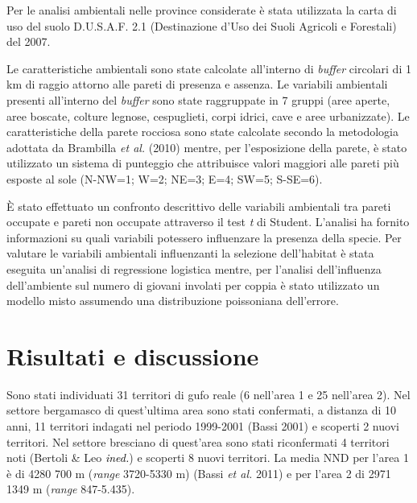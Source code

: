 Per le analisi ambientali nelle province considerate \`e stata
utilizzata la carta di uso del suolo D.U.S.A.F. 2.1 (Destinazione
d{\textquoteright}Uso dei Suoli Agricoli e Forestali) del 2007.

Le caratteristiche ambientali sono state calcolate
all{\textquoteright}interno di \textit{buffer }circolari di 1 km di
raggio attorno alle pareti di presenza e assenza. Le variabili
ambientali presenti all{\textquoteright}interno del \textit{buffer
}sono state raggruppate in 7 gruppi (aree aperte, aree boscate, colture
legnose, cespuglieti, corpi idrici, cave e aree urbanizzate). Le
caratteristiche della parete rocciosa sono state calcolate secondo la
metodologia adottata da Brambilla \textit{et al. }(2010) mentre, per
l{\textquoteright}esposizione della parete, \`e stato utilizzato un
sistema di punteggio che attribuisce valori maggiori alle pareti pi\`u
esposte al sole (N-NW=1; W=2; NE=3; E=4; SW=5; S-SE=6).

\`E stato effettuato un confronto descrittivo delle variabili ambientali
tra pareti occupate e pareti non occupate attraverso il test \textit{t
}di Student. L{\textquoteright}analisi ha fornito informazioni su quali
variabili potessero influenzare la presenza della specie. Per valutare
le variabili ambientali influenzanti la selezione
dell{\textquoteright}habitat \`e stata eseguita
un{\textquoteright}analisi di regressione logistica mentre, per
l{\textquoteright}analisi dell{\textquoteright}influenza
dell{\textquoteright}ambiente sul numero di giovani involati per coppia
\`e stato utilizzato un modello misto assumendo una distribuzione
poissoniana dell{\textquoteright}errore. 

\section*{Risultati e discussione}

Sono stati individuati 31 territori di gufo reale (6
nell{\textquoteright}area 1 e 25 nell{\textquoteright}area 2). Nel
settore bergamasco di quest{\textquoteright}ultima area sono stati
confermati, a distanza di 10 anni, 11 territori indagati nel periodo
1999-2001 (Bassi 2001) e scoperti 2 nuovi territori. Nel settore
bresciano di quest{\textquoteright}area sono stati riconfermati 4
territori noti (Bertoli \& Leo \textit{\textcolor{black}{ined.}}) e
scoperti 8 nuovi territori. La media NND per l{\textquoteright}area 1
\`e di 4280 {\textpm} 700 m (\textit{range} 3720-5330 m) (Bassi
\textit{et al. }2011) e per l{\textquoteright}area 2 di 2971 {\textpm}
1349 m (\textit{range} 847-5.435). 

